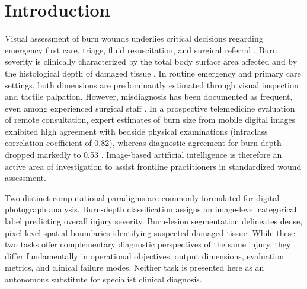 \documentclass[11pt,a4paper]{article}
\begin{document}
\vspace{2ex}

\section{Introduction}

Visual assessment of burn wounds underlies critical decisions regarding emergency first care, triage, fluid resuscitation, and surgical referral \cite{boissin2022}. Burn severity is clinically characterized by the total body surface area affected and by the histological depth of damaged tissue \cite{boissin2022}. In routine emergency and primary care settings, both dimensions are predominantly estimated through visual inspection and tactile palpation. However, misdiagnosis has been documented as frequent, even among experienced surgical staff \cite{boissin2022}. In a prospective telemedicine evaluation of remote consultation, expert estimates of burn size from mobile digital images exhibited high agreement with bedside physical examinations (intraclass correlation coefficient of 0.82), whereas diagnostic agreement for burn depth dropped markedly to 0.53 \cite{blom2020}. Image-based artificial intelligence is therefore an active area of investigation to assist frontline practitioners in standardized wound assessment.

Two distinct computational paradigms are commonly formulated for digital photograph analysis. Burn-depth classification assigns an image-level categorical label predicting overall injury severity. Burn-lesion segmentation delineates dense, pixel-level spatial boundaries identifying suspected damaged tissue. While these two tasks offer complementary diagnostic perspectives of the same injury, they differ fundamentally in operational objectives, output dimensions, evaluation metrics, and clinical failure modes. Neither task is presented here as an autonomous substitute for specialist clinical diagnosis.
\end{document}
